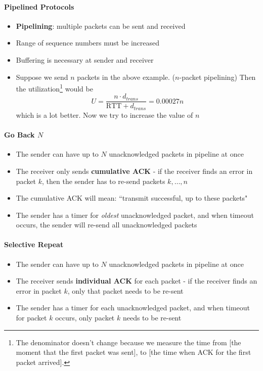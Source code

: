 \paragraph{Pipelined Protocols}
\begin{itemize}
	\item \textbf{Pipelining}: multiple packets can be sent and received
	\item Range of sequence numbers must be increased
	\item Buffering is necessary at sender and receiver
	\item Suppose we send $n$ packets in the above example. ($n$-packet pipelining) Then the utilization\footnote{The denominator doesn't change because we measure the time from [the moment that the first packet was sent], to [the time when ACK for the first packet arrived].} would be
	$$U = \frac{n\cdot d_{trans}}{\text{RTT} + d_{trans}} = 0.00027 n$$ 
	which is a lot better. Now we try to increase the value of $n$
\end{itemize}

\paragraph{Go Back $N$}
\begin{itemize}
	\item The sender can have up to $N$ unacknowledged packets in pipeline at once
	\item The receiver only sends \textbf{cumulative ACK} - if the receiver finds an error in packet $k$, then the sender has to re-send packets $k, \dots, n$
	\item The cumulative ACK will mean: ``transmit successful, up to these packets"
	\item The sender has a timer for \textit{oldest} unacknowledged packet, and when timeout occurs, the sender will re-send all unacknowledged packets
\end{itemize}

\paragraph{Selective Repeat}
\begin{itemize}
	\item The sender can have up to $N$ unacknowledged packets in pipeline at once
	\item The receiver sends \textbf{individual ACK} for each packet - if the receiver finds an error in packet $k$, only that packet needs to be re-sent
	\item The sender has a timer for each unacknowledged packet, and when timeout for packet $k$ occurs, only packet $k$ needs to be re-sent
\end{itemize}

